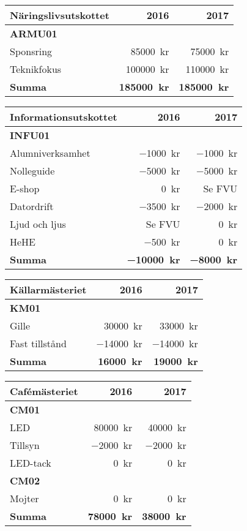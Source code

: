 \documentclass[../_main/handlingar.tex]{subfiles}
\begin{document}
\begin{tabularx}{10cm}{X r r}
    \textbf{\large Näringslivsutskottet} & \textbf{2016} & \textbf{2017} \\
    \hline
    \textbf{ARMU01} \\
    Sponsring & \SI{85000}{kr} & \SI{75000}{kr} \\
    Teknikfokus & \SI{100000}{kr} & \SI{110000}{kr} \\
    \hline
    \textbf{Summa} & \textbf{\SI{185000}{kr}} & \textbf{\SI{185000}{kr}} \\
\end{tabularx}

\begin{tabularx}{10cm}{X r r}
    \textbf{\large Informationsutskottet} & \textbf{2016} & \textbf{2017} \\
    \hline
    \textbf{INFU01} \\
    Alumniverksamhet & \SI{-1000}{kr} & \SI{-1000}{kr} \\
    Nolleguide & \SI{-5000}{kr} & \SI{-5000}{kr} \\
    E-shop & \SI{0}{kr} & Se FVU \\
    Datordrift & \SI{-3500}{kr} & \SI{-2000}{kr} \\
    Ljud och ljus & Se FVU & \SI{0}{kr} \\
    HeHE & \SI{-500}{kr} & \SI{0}{kr} \\
    \hline
    \textbf{Summa} & \textbf{\SI{-10000}{kr}} & \textbf{\SI{-8000}{kr}} \\
\end{tabularx}

\begin{tabularx}{10cm}{X r r}
    \textbf{\large Källarmästeriet} & \textbf{2016} & \textbf{2017} \\
    \hline
    \textbf{KM01} \\
    Gille & \SI{30000}{kr} & \SI{33000}{kr} \\
    Fast tillstånd & \SI{-14000}{kr} & \SI{-14000}{kr} \\
    \hline
    \textbf{Summa} & \textbf{\SI{16000}{kr}} & \textbf{\SI{19000}{kr}} \\
\end{tabularx}

\begin{tabularx}{10cm}{X r r}
    \textbf{\large Cafémästeriet} & \textbf{2016} & \textbf{2017} \\
    \hline
    \textbf{CM01} \\
    LED & \SI{80000}{kr} & \SI{40000}{kr} \\
    Tillsyn & \SI{-2000}{kr} & \SI{-2000}{kr} \\
    LED-tack & \SI{0}{kr} & \SI{0}{kr} \\
    \textbf{CM02} \\
    Mojter & \SI{0}{kr} & \SI{0}{kr} \\
    \hline
    \textbf{Summa} & \textbf{\SI{78000}{kr}} & \textbf{\SI{38000}{kr}} \\
\end{tabularx}
\end{document}
